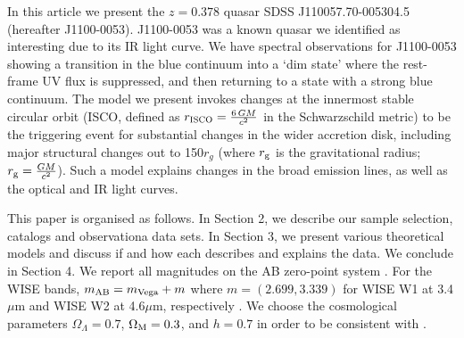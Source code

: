 \documentclass[a4paper,fleqn,usenatbib]{mnras}
\begin{document}
In this article we present the $z=0.378$ quasar SDSS
J110057.70-005304.5 (hereafter J1100-0053).  J1100-0053 was a known
quasar we identified as interesting due to its IR light curve. We have
spectral observations for J1100-0053 showing a transition in the blue
continuum into a `dim state' where the rest-frame UV flux is
suppressed, and then returning to a state with a strong blue
continuum. The model we present invokes changes at the innermost
stable circular orbit (ISCO, defined as $r_{\textsc{ISCO}}={\frac
{6\,GM}{c^{2}}}$ in the Schwarzschild metric) to be the triggering
event for substantial changes in the wider accretion disk, including
major structural changes out to 150$r_{g}$ (where $r_{\rm g}$ is the
gravitational radius; $r_{\rm g}=\frac{GM}{c^2}$). Such a model
explains changes in the broad emission lines, as well as the optical
and IR light curves.

This paper is organised as follows. In Section 2, we describe
our sample selection, catalogs and observationa data sets.  In Section
3, we present various theoretical models and discuss if and how each
describes and explains the data.  We conclude in Section 4.  We
report all magnitudes on the AB zero-point system \citep{Oke_Gunn1983,
Fukugita1996}.  For the WISE bands, $m_{\rm AB} = m_{\rm Vega} + m$
where $m = (2.699, 3.339)$ for WISE W1 at 3.4$\mu$m and WISE W2 at
4.6$\mu$m, respectively \citep{Cutri2011}. We choose the
cosmological parameters $\Omega_{\Lambda} = 0.7$, $\Omega_{\rm M} =
0.3$, and $h = 0.7$ in order to be consistent with \citet{Shen2011}.
\end{document}
